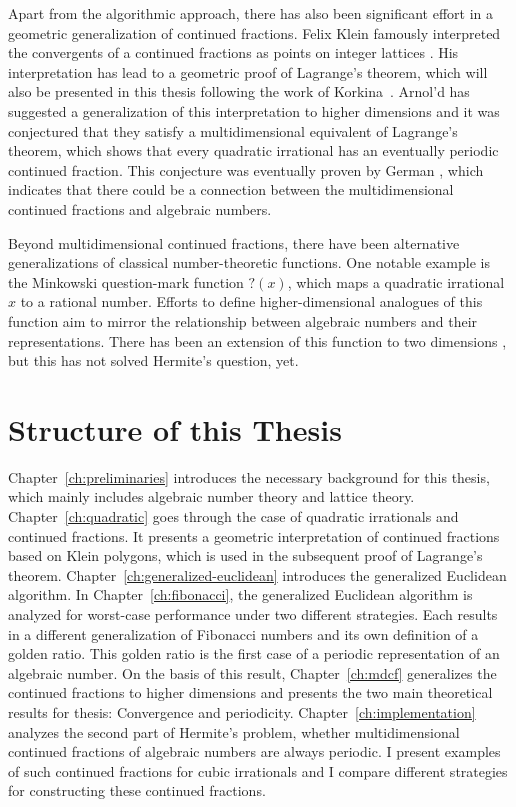 Apart from the algorithmic approach,
there has also been significant effort in a geometric generalization of
continued fractions.
Felix Klein famously interpreted the convergents of a continued fractions as
points on integer lattices \cite{Klein95}.
His interpretation has lead to a geometric proof of Lagrange’s theorem, which
will also be presented in this thesis following the work of Korkina~\cite{Korkina96}.
Arnol'd has suggested a generalization of this interpretation to higher
dimensions \cite{Arnold98} and it was conjectured that they satisfy a
multidimensional equivalent of Lagrange's theorem,
which shows that every quadratic irrational has an eventually periodic
continued fraction.
This conjecture was eventually proven by German \cite{German08},
which indicates that there could be a connection between the multidimensional
continued fractions and algebraic numbers.

Beyond multidimensional continued fractions, there have been alternative
generalizations of classical number-theoretic functions.
One notable example is the Minkowski question-mark function $?(x)$,
which maps a quadratic irrational $x$ to a rational number.
Efforts to define higher-dimensional analogues of this function aim to mirror
the relationship between algebraic numbers and their representations.
There has been an extension of this function to two dimensions \cite{Beaver04},
but this has not solved Hermite's question, yet.

\section{Structure of this Thesis}

Chapter~\ref{ch:preliminaries} introduces the necessary background for this thesis,
which mainly includes algebraic number theory and lattice theory.
Chapter~\ref{ch:quadratic} goes through the case of quadratic irrationals and continued fractions.
It presents a geometric interpretation of continued fractions based on Klein polygons,
which is used in the subsequent proof of Lagrange's theorem.
Chapter~\ref{ch:generalized-euclidean} introduces the generalized Euclidean algorithm.
In Chapter~\ref{ch:fibonacci}, the generalized Euclidean algorithm is analyzed
for worst-case performance under two different strategies.
Each results in a different generalization of Fibonacci numbers and its own definition of a golden ratio.
This golden ratio is the first case of a periodic representation of an algebraic number.
On the basis of this result, Chapter~\ref{ch:mdcf} generalizes the continued fractions to higher dimensions
and presents the two main theoretical results for thesis: Convergence and periodicity.
Chapter~\ref{ch:implementation} analyzes the second part of Hermite's problem,
whether multidimensional continued fractions of algebraic numbers are always periodic.
I present examples of such continued fractions for cubic irrationals and I
compare different strategies for constructing these continued fractions.
